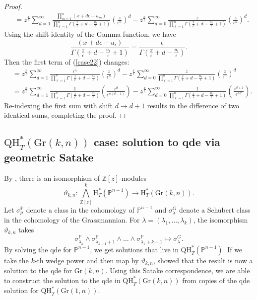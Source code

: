 \documentclass[12pt]{article}
\newcommand{\bb}[1]{\mathbb{#1}}
\theoremstyle{plain}
\newcommand{\Z}{\mathbb{Z}}
\theoremstyle{definition}
\begin{document}
\begin{proof}
\begin{align}
    &=z^{\frac{x}{\epsilon}}     \sum_{d=1} ^\infty \frac{ \prod_{m=1} ^{n} (x+d\epsilon - u_m) }{\prod_{\ell=1} ^n \Gamma \left(\frac{x}{\epsilon}+d-\frac{u_\ell}{\epsilon}+1\right)}\left(\frac{z}{\epsilon^n}\right)^d - z^{\frac{x}{\epsilon}}     \sum_{d=0} ^\infty \frac{ z }{\prod_{\ell=1} ^n \Gamma \left(\frac{x}{\epsilon}+d-\frac{u_\ell}{\epsilon}+1\right)}\left(\frac{z}{\epsilon^n}\right)^d. \label{case22}
\end{align}
Using the shift identity of the Gamma function, we have $$\frac{(x+d\epsilon -u_i)}{\Gamma(\frac{x}{\epsilon} +d -\frac{u_i}{\epsilon}+1)} = \frac{\epsilon}{ \Gamma(\frac{x}{\epsilon} +d -\frac{u_i}{\epsilon})}.$$ Then the first term of (\ref{case22}) changes:
\begin{align*}
    &=z^{\frac{x}{\epsilon}}     \sum_{d=1} ^\infty \frac{ \epsilon^n }{\prod_{\ell=1} ^n \Gamma \left(\frac{x}{\epsilon}+d-\frac{u_\ell}{\epsilon}\right)}\left(\frac{z}{\epsilon^n}\right)^d - z^{\frac{x}{\epsilon}}     \sum_{d=0} ^\infty \frac{ z }{\prod_{\ell=1} ^n \Gamma \left(\frac{x}{\epsilon}+d-\frac{u_\ell}{\epsilon}+1\right)}\left(\frac{z}{\epsilon^n}\right)^d\\
    &=z^{\frac{x}{\epsilon}}     \sum_{d=1} ^\infty \frac{ 1 }{\prod_{\ell=1} ^n \Gamma \left(\frac{x}{\epsilon}+d-\frac{u_\ell}{\epsilon}\right)}\left(\frac{z^d}{\epsilon^{n(d-1)}}\right) - z^{\frac{x}{\epsilon}}     \sum_{d=0} ^\infty \frac{ 1 }{\prod_{\ell=1} ^n \Gamma \left(\frac{x}{\epsilon}+d-\frac{u_\ell}{\epsilon}+1\right)}\left(\frac{z^{d+1}}{\epsilon^{nd}}\right).
\end{align*}
Re-indexing the first sum with shift $d\to d+1$ results in the difference of two identical sums, completing the proof.
\end{proof}

\subsection{\texorpdfstring{$\textrm{QH}^*_T(\textrm{Gr}(k,n))$}{QHT} case: solution to qde via geometric Satake}

By \cite{cotti2024satakecorrespondenceequivariantquantum}, there is an isomorphism of $\Z[z]$-modules
$$
\vartheta_{k,n} : \bigwedge^k_{\Z[z]} \mathrm{H}^*_T (\bb P^{n-1}) \to \mathrm{H}_T^* ( \mathrm{Gr}(k,n) ).
$$
Let $\sigma^{\bb P}_p$ denote a class in the cohomology of $\bb P^{n-1}$ and $\sigma^G_\lambda$ denote a Schubert class in the cohomology of the Grassmannian. For $\lambda = (\lambda_1, \ldots, \lambda_k)$, the isomorphism $\vartheta_{k,n}$ takes
$$
\sigma^{\bb P}_{\lambda_k} \wedge \sigma^{\bb P}_{\lambda_{k-1} + 1} \wedge \ldots \wedge \sigma^{\bb P}_{\lambda_1 +k - 1} \mapsto \sigma^G_\lambda.
$$
By solving the qde for $\bb P^{n-1}$, we get solutions that live in $\mathrm{QH}_T^* (\bb P^{n-1})$. If we take the $k$-th wedge power and then map by $\vartheta_{k,n}$, \cite{cotti2024satakecorrespondenceequivariantquantum} showed that the result is now a solution to the qde for $\mathrm{Gr}(k,n)$. Using this Satake correspondence, we are able to construct the solution to the qde in $\mathrm{QH}^*_T(\mathrm{Gr}(k,n))$ from copies of the qde solution for $\mathrm{QH}^*_T(\mathrm{Gr}(1,n))$.
\end{document}

